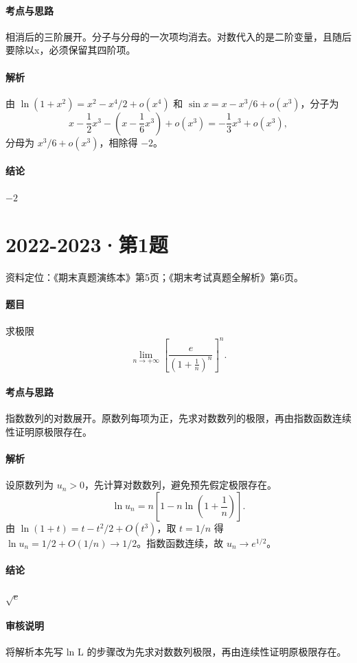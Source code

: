 \documentclass[UTF8,fontset=fandol,12pt,oneside,openany]{ctexrep}
\theoremstyle{definition}
\begin{document}
\paragraph{考点与思路}
相消后的三阶展开。分子与分母的一次项均消去。对数代入的是二阶变量，且随后要除以x，必须保留其四阶项。
\paragraph{解析}
由 $\ln(1+x^2)=x^2-x^4/2+o(x^4)$ 和 $\sin x=x-x^3/6+o(x^3)$，分子为 \[x-\frac12x^3-\left(x-\frac16x^3\right)+o(x^3)=-\frac13x^3+o(x^3),\]分母为 $x^3/6+o(x^3)$，相除得 $-2$。
\paragraph{结论}
$-2$

\par\addvspace{18pt}\noindent\begin{minipage}{\linewidth}
\section{2022-2023·第1题}
\label{exam:08:q6}
资料定位：《期末真题演练本》第5页；《期末考试真题全解析》第6页。
\paragraph{题目}
求极限 \[\lim_{n\to+\infty}\left[\frac{e}{(1+\frac1n)^n}\right]^n.\]
\end{minipage}\par
\paragraph{考点与思路}
指数数列的对数展开。原数列每项为正，先求对数数列的极限，再由指数函数连续性证明原极限存在。
\paragraph{解析}
设原数列为 $u_n>0$，先计算对数数列，避免预先假定极限存在。\[\ln u_n=n\left[1-n\ln\left(1+\frac1n\right)\right].\]由 $\ln(1+t)=t-t^2/2+O(t^3)$，取 $t=1/n$ 得 $\ln u_n=1/2+O(1/n)\to1/2$。指数函数连续，故 $u_n\to e^{1/2}$。
\paragraph{结论}
$\sqrt e$
\paragraph{审核说明}
将解析本先写 ln L 的步骤改为先求对数数列极限，再由连续性证明原极限存在。
\end{document}
